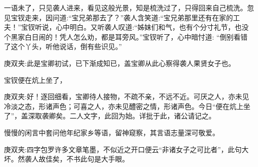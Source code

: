 \begin{parag}
    一语未了，只见袭人进来，看见这般光景，知是梳洗过了，只得回来自己梳洗。忽见宝钗走来，因问道:“宝兄弟那去了？”袭人含笑道:“宝兄弟那里还有在家的工夫！”宝钗听说，心中明白。又听袭人叹道:“姊妹们和气，也有个分寸礼节，也没个黑家白日闹的！凭人怎么劝，都是耳旁风。”宝钗听了，心中暗忖道: “倒别看错了这个丫头，听他说话，倒有些识见。”\begin{note}庚双夹:此是宝卿初试，已下渐成知已，盖宝卿从此心察得袭人果贤女子也。\end{note}宝钗便在炕上坐了，\begin{note}庚双夹:好！逐回细看，宝卿待人接物，不疏不亲，不远不近。可厌之人，亦未见冷淡之态，形诸声色；可喜之人，亦未见醴密之情，形诸声色。今日“便在炕上坐了”，盖深取袭卿矣。二人文字，此回为始。详批于此，诸公请记之。\end{note}慢慢的闲言中套问他年纪家乡等语，留神窥察，其言语志量深可敬爱。\begin{note}庚双夹:四字包罗许多文章笔墨，不似近之开口便云“非诸女子之可比者”，此句大坏。然袭人故佳矣，不书此句是大手眼。\end{note}
\end{parag}



